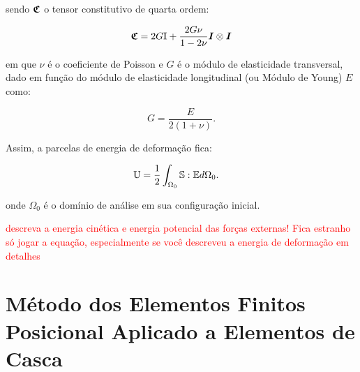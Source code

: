 \noindent sendo $\boldsymbol{\mathfrak{C}}$ o tensor constitutivo de quarta ordem:

\begin{equation}
    \boldsymbol{\mathfrak{C}}=2G\mathbb{I}+\frac{2G\nu}{1-2\nu}\boldsymbol{I}\otimes\boldsymbol{I}
\end{equation}

\noindent em que $\nu$ é o coeficiente de Poisson e $G$ é o módulo de elasticidade transversal, dado em função do módulo de elasticidade longitudinal (ou Módulo de Young) $E$ como:

\begin{equation}
    G=\frac{E}{2(1+\nu)}\text{.}
\end{equation}

Assim, a parcelas de energia de deformação fica:

\begin{subequations}
    \begin{align}
         & \mathbb{U}=\frac{1}{2}\int_{\Omega_0}{\boldsymbol{\mathbb{S}}:\mathbb{E} d\Omega_0}\text{.}
    \end{align}
\end{subequations}

\noindent onde $\Omega_0$ é o domínio de análise em sua configuração inicial.

\textcolor{red}{descreva a energia cinética e energia potencial das forças externas! Fica estranho só jogar a equação, especialmente se você descreveu a energia de deformação em detalhes} 



\section{Método dos Elementos Finitos Posicional Aplicado a Elementos de Casca} \label{MEFP}

